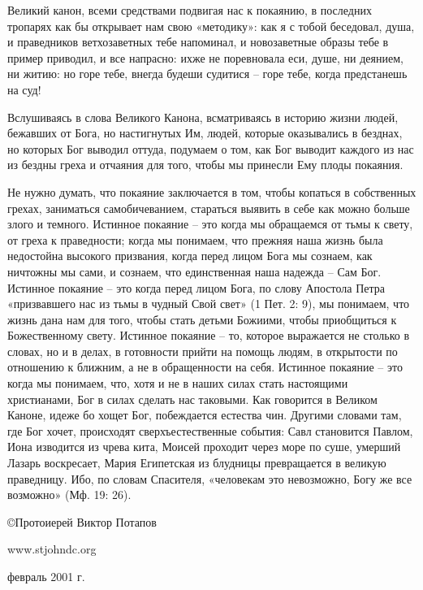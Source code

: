 Великий канон, всеми средствами подвигая нас к покаянию, в последних тропарях как бы открывает нам свою «методику»: как я с тобой беседовал, душа, и праведников ветхозаветных тебе напоминал, и новозаветные образы тебе в пример приводил, и все напрасно: ихже не поревновала еси, душе, ни деянием, ни житию: но горе тебе, внегда будеши судитися – горе тебе, когда предстанешь на суд!


Вслушиваясь в слова Великого Канона, всматриваясь в историю жизни людей, бежавших от Бога, но настигнутых Им, людей, которые оказывались в безднах, но которых Бог выводил оттуда, подумаем о том, как Бог выводит каждого из нас из бездны греха и отчаяния для того, чтобы мы принесли Ему плоды покаяния.


Не нужно думать, что покаяние заключается в том, чтобы копаться в собственных грехах, заниматься самобичеванием, стараться выявить в себе как можно больше злого и темного. Истинное покаяние – это когда мы обращаемся от тьмы к свету, от греха к праведности; когда мы понимаем, что прежняя наша жизнь была недостойна высокого призвания, когда перед лицом Бога мы сознаем, как ничтожны мы сами, и сознаем, что единственная наша надежда – Сам Бог. Истинное покаяние – это когда перед лицом Бога, по слову Апостола Петра «призвавшего нас из тьмы в чудный Свой свет» (1 Пет. 2: 9), мы понимаем, что жизнь дана нам для того, чтобы стать детьми Божиими, чтобы приобщиться к Божественному свету. Истинное покаяние – то, которое выражается не столько в словах, но и в делах, в готовности прийти на помощь людям, в открытости по отношению к ближним, а не в обращенности на себя. Истинное покаяние – это когда мы понимаем, что, хотя и не в наших силах стать настоящими христианами, Бог в силах сделать нас таковыми. Как говорится в Великом Каноне, идеже бо хощет Бог, побеждается естества чин. Другими словами там, где Бог хочет, происходят сверхъестественные события: Савл становится Павлом, Иона изводится из чрева кита, Моисей проходит через море по суше, умерший Лазарь воскресает, Мария Египетская из блудницы превращается в великую праведницу. Ибо, по словам Спасителя, «человекам это невозможно, Богу же все возможно» (Мф. 19: 26).


©Протоиерей Виктор Потапов


www.stjohndc.org


февраль 2001 г.


\mychapterending

 

